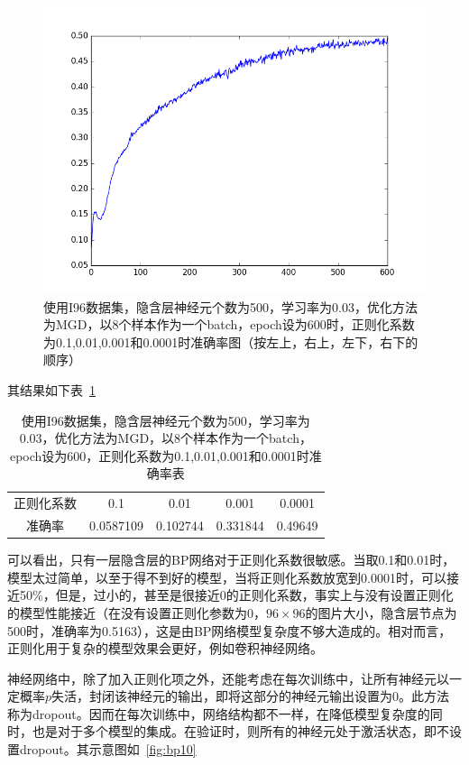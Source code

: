 \begin{figure}[htb]
\includegraphics[scale=0.32]{../figures/Log/BP_new10/BP_new10_acc.png} 
\caption{使用I96数据集，隐含层神经元个数为500，学习率为0.03，优化方法为MGD，以8个样本作为一个batch，epoch设为600时，正则化系数为0.1,0.01,0.001和0.0001时准确率图（按左上，右上，左下，右下的顺序）}
\label{fig:bp9}
\end{figure}

其结果如下表~\ref{table:bp2}
\begin{table}[htb]
\centering
\caption{使用I96数据集，隐含层神经元个数为500，学习率为0.03，优化方法为MGD，以8个样本作为一个batch，epoch设为600，正则化系数为0.1,0.01,0.001和0.0001时准确率表}
\begin{tabular}{ccccc}
\toprule[2pt]
正则化系数 & 0.1 & 0.01 & 0.001 & 0.0001 \\ 
准确率 & 0.0587109 & 0.102744 & 0.331844 & 0.49649 \\ 
\bottomrule[2pt]
\end{tabular} 
\label{table:bp2}
\end{table}
可以看出，只有一层隐含层的BP网络对于正则化系数很敏感。当取0.1和0.01时，模型太过简单，以至于得不到好的模型，当将正则化系数放宽到0.0001时，可以接近50\%，但是，过小的，甚至是很接近0的正则化系数，事实上与没有设置正则化的模型性能接近（在没有设置正则化参数为0，$96\times96$的图片大小，隐含层节点为500时，准确率为0.5163），这是由BP网络模型复杂度不够大造成的。相对而言，正则化用于复杂的模型效果会更好，例如卷积神经网络。

神经网络中，除了加入正则化项之外，还能考虑在每次训练中，让所有神经元以一定概率$p$失活，封闭该神经元的输出，即将这部分的神经元输出设置为0。此方法称为dropout。因而在每次训练中，网络结构都不一样，在降低模型复杂度的同时，也是对于多个模型的集成。在验证时，则所有的神经元处于激活状态，即不设置dropout。其示意图如~\ref{fig:bp10}

